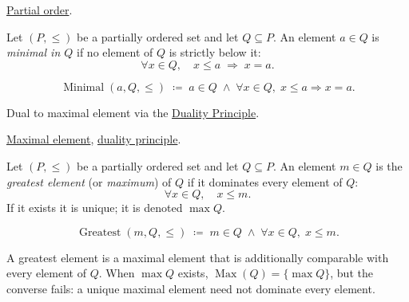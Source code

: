 \begin{remark*}[Dependencies]
\hyperref[def:partial-order]{Partial order}.
\end{remark*}


\begin{definition}
\label{def:minimal-element}
Let $(P, \leq)$ be a partially ordered set and let $Q \subseteq P$.  An
element $a \in Q$ is \emph{minimal in $Q$} if no element of $Q$ is
strictly below it:
\[
\forall x \in Q, \quad x \leq a \;\Longrightarrow\; x = a.
\]
\end{definition}

\begin{remark*}
\[
\operatorname{Minimal}(a, Q, \leq)
\;\coloneqq\;
a \in Q \;\land\; \forall x \in Q,\; x \leq a \Rightarrow x = a.
\]
\end{remark*}

\begin{remark*}[Interpretation]
Dual to maximal element via the
\hyperref[prop:duality-principle]{Duality Principle}.
\end{remark*}

\begin{remark*}[Dependencies]
\hyperref[def:maximal-element]{Maximal element},
\hyperref[prop:duality-principle]{duality principle}.
\end{remark*}


\begin{definition}
\label{def:greatest-element}
Let $(P, \leq)$ be a partially ordered set and let $Q \subseteq P$.  An
element $m \in Q$ is the \emph{greatest element} (or \emph{maximum}) of
$Q$ if it dominates every element of $Q$:
\[
\forall x \in Q, \quad x \leq m.
\]
If it exists it is unique; it is denoted $\max Q$.
\end{definition}

\begin{remark*}
\[
\operatorname{Greatest}(m, Q, \leq)
\;\coloneqq\;
m \in Q \;\land\; \forall x \in Q,\; x \leq m.
\]
\end{remark*}

\begin{remark*}[Interpretation]
A greatest element is a maximal element that is additionally comparable
with every element of $Q$.  When $\max Q$ exists,
$\operatorname{Max}(Q) = \{\max Q\}$, but the converse fails: a unique
maximal element need not dominate every element.
\end{remark*}

